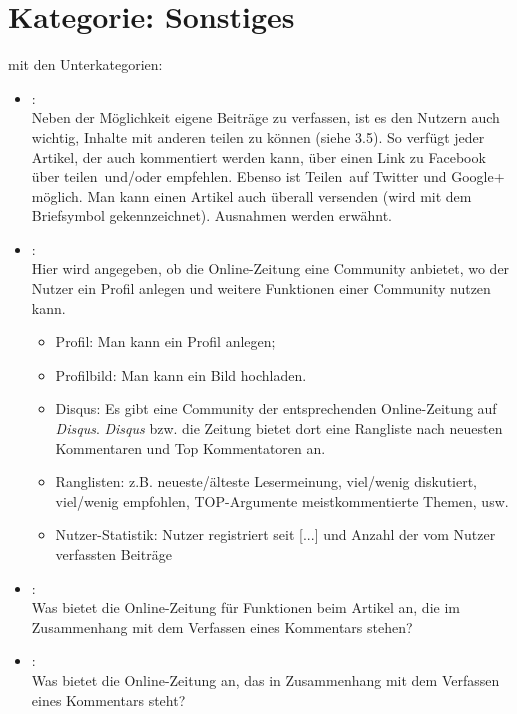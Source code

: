 \section{Kategorie: \glqq Sonstiges\grqq} 

mit den Unterkategorien:
\begin{itemize}[noitemsep]
  \item{}\grqq:\\
    Neben der Möglichkeit eigene Beiträge zu verfassen, ist es den Nutzern auch
    wichtig, Inhalte mit anderen teilen zu können (siehe 3.5). So verfügt jeder
    Artikel, der auch kommentiert werden kann, über einen Link zu Facebook über
    \glqq teilen\grqq\ und/oder \glqq empfehlen\grqq.  Ebenso ist \glqq
    Teilen\grqq\ auf Twitter und Google+ möglich. Man kann einen Artikel auch
    überall versenden (wird mit dem Briefsymbol gekennzeichnet). Ausnahmen
    werden erwähnt.

  \item{}\grqq:\\
    Hier wird angegeben, ob die Online-Zeitung eine Community anbietet, wo der
    Nutzer ein Profil anlegen und weitere Funktionen einer Community nutzen
    kann.
    \begin{itemize}[noitemsep]
      \item Profil: Man kann ein Profil anlegen;
      \item Profilbild: Man kann ein Bild hochladen.
      \item Disqus: Es gibt eine Community der entsprechenden Online-Zeitung auf
        {\slshape Disqus}. {\slshape Disqus} bzw.  die Zeitung bietet dort eine Rangliste nach \glqq
        neuesten Kommentaren\grqq{} und  \glqq Top Kommentatoren\grqq{} an.
      \item Ranglisten: z.B. neueste/älteste Lesermeinung, viel/\-we\-nig
        diskutiert, viel/we\-nig empfohlen, TOP-Argumente meistkommentierte
        Themen, usw.
      \item Nutzer-Statistik: Nutzer registriert seit [...] und
        Anzahl der vom Nutzer verfassten Beiträge
    \end{itemize}

  \item{}\grqq:\\
    Was bietet die Online-Zeitung für Funktionen beim Artikel an, die im
    Zusammenhang mit dem Verfassen eines Kommentars stehen?

  \item{}\grqq:\\
    Was bietet die Online-Zeitung an, das in Zusammenhang mit dem Verfassen
    eines Kommentars steht?
\end{itemize}


